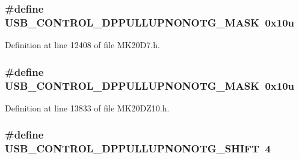 \subsubsection[{\texorpdfstring{U\+S\+B\+\_\+\+C\+O\+N\+T\+R\+O\+L\+\_\+\+D\+P\+P\+U\+L\+L\+U\+P\+N\+O\+N\+O\+T\+G\+\_\+\+M\+A\+SK}{USB_CONTROL_DPPULLUPNONOTG_MASK}}]{\setlength{\rightskip}{0pt plus 5cm}\#define U\+S\+B\+\_\+\+C\+O\+N\+T\+R\+O\+L\+\_\+\+D\+P\+P\+U\+L\+L\+U\+P\+N\+O\+N\+O\+T\+G\+\_\+\+M\+A\+SK~0x10u}\hypertarget{group___u_s_b___register___masks_ga764d9d972859eeded5e092a77eb4de79}{}\label{group___u_s_b___register___masks_ga764d9d972859eeded5e092a77eb4de79}


Definition at line 12408 of file M\+K20\+D7.\+h.

\subsubsection[{\texorpdfstring{U\+S\+B\+\_\+\+C\+O\+N\+T\+R\+O\+L\+\_\+\+D\+P\+P\+U\+L\+L\+U\+P\+N\+O\+N\+O\+T\+G\+\_\+\+M\+A\+SK}{USB_CONTROL_DPPULLUPNONOTG_MASK}}]{\setlength{\rightskip}{0pt plus 5cm}\#define U\+S\+B\+\_\+\+C\+O\+N\+T\+R\+O\+L\+\_\+\+D\+P\+P\+U\+L\+L\+U\+P\+N\+O\+N\+O\+T\+G\+\_\+\+M\+A\+SK~0x10u}\hypertarget{group___u_s_b___register___masks_ga764d9d972859eeded5e092a77eb4de79}{}\label{group___u_s_b___register___masks_ga764d9d972859eeded5e092a77eb4de79}


Definition at line 13833 of file M\+K20\+D\+Z10.\+h.

\subsubsection[{\texorpdfstring{U\+S\+B\+\_\+\+C\+O\+N\+T\+R\+O\+L\+\_\+\+D\+P\+P\+U\+L\+L\+U\+P\+N\+O\+N\+O\+T\+G\+\_\+\+S\+H\+I\+FT}{USB_CONTROL_DPPULLUPNONOTG_SHIFT}}]{\setlength{\rightskip}{0pt plus 5cm}\#define U\+S\+B\+\_\+\+C\+O\+N\+T\+R\+O\+L\+\_\+\+D\+P\+P\+U\+L\+L\+U\+P\+N\+O\+N\+O\+T\+G\+\_\+\+S\+H\+I\+FT~4}\hypertarget{group___u_s_b___register___masks_ga5bae9683a5ae7c48617b8d24a35786ce}{}\label{group___u_s_b___register___masks_ga5bae9683a5ae7c48617b8d24a35786ce}


